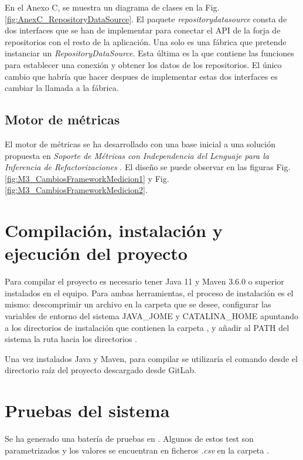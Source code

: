 En el Anexo C, se muestra un diagrama de clases en la Fig. \ref{fig:AnexC_RepositoryDataSource}. El paquete \textit{repositorydatasource} consta de dos interfaces que se han de implementar para conectar el API de la forja de repositorios con el resto de la aplicación. Una solo es una fábrica que pretende instanciar un \textit{RepositoryDataSource}. Esta última es la que contiene las funciones para establecer una conexión y obtener los datos de los repositorios. El único cambio que habría que hacer despues de implementar estas dos interfaces es cambiar la llamada a la fábrica.

\subsection{Motor de métricas}
El motor de métricas se ha desarrollado con una base inicial a una solución propuesta en \textit{Soporte de Métricas con Independencia del Lenguaje para la Inferencia de Refactorizaciones} \cite{marticorena_sanchez_soporte_2005}. El diseño se puede observar en las figuras Fig. \ref{fig:M3_CambiosFrameworkMedicion1} y Fig. \ref{fig:M3_CambiosFrameworkMedicion2}.

\section{Compilación, instalación y ejecución del proyecto}
Para compilar el proyecto es necesario tener Java 11 y Maven 3.6.0 o superior instalados en el equipo. Para ambas herramientas, el proceso de instalación es el mismo: descomprimir un archivo en la carpeta que se desee, configurar las variables de entorno del sistema JAVA\_JOME y CATALINA\_HOME apuntando a los directorios de instalación que contienen la carpeta , y añadir al PATH del sistema la ruta hacia los directorios .

Una vez instalados Java y Maven, para compilar se utilizaría el comando  desde el directorio raíz del proyecto descargado desde GitLab.

\section{Pruebas del sistema}
Se ha generado una batería de pruebas en . Algunos de estos test son parametrizados y los valores se encuentran en ficheros \textit{.csv} en la carpeta .
